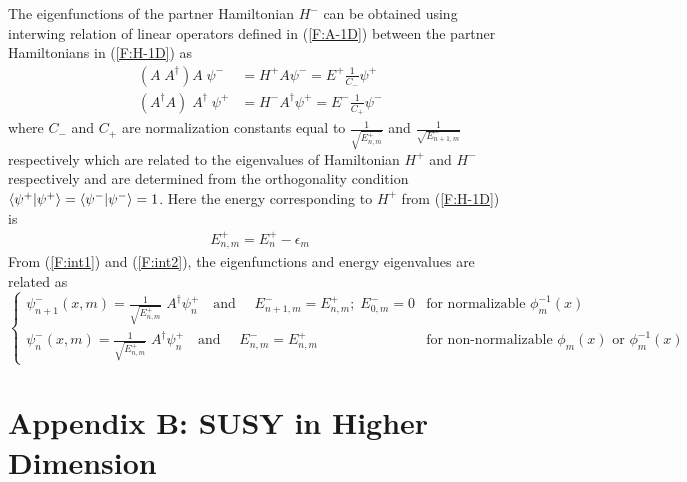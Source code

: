 \documentclass[12pt]{article}
\numberwithin{equation}{section} %
\begin{document}
The eigenfunctions of the partner Hamiltonian $H^-$ can be obtained using interwing relation \cite{fellows2009factorization,marquette2013two} of linear operators defined in (\ref{F:A-1D}) between the partner Hamiltonians in (\ref{F:H-1D}) as
\begin{align}
    \left(A\;A^\dagger\right) A\;\psi^-&=H^+A\psi^-=E^+\frac{1}{C_-}\psi^+\label{F:int1}\\
    \left(A^\dagger A\right)\;A^\dagger\;\psi^+&=H^-A^\dagger\psi^+=E^-\frac{1}{C_+}\psi^-\label{F:int2} 
\end{align}
where \( C_- \) and \( C_+ \) are normalization constants equal to \( \frac{1}{\sqrt{E^+_{n,m}}} \) and \( \frac{1}{\sqrt{E^-_{n+1,m}}} \) respectively which are related to the eigenvalues of Hamiltonian $H^+$ and $H^-$ respectively and are determined from the orthogonality condition \( \braket{\psi^+|\psi^+}=\braket{\psi^-|\psi^-}=1 \). Here the energy corresponding to $H^+$ from (\ref{F:H-1D}) is
\begin{align}\label{E+(n,m)}
    E^+_{n,m}=E^+_n-\epsilon_m
\end{align}
From (\ref{F:int1}) and (\ref{F:int2}), the eigenfunctions and energy eigenvalues are related as
\begin{equation}\label{F:psi-1D}
\begin{cases}
    \psi^-_{n+1}(x,m)=\frac{1}{\sqrt{E^+_{n,m}}}\;A^\dagger\psi^+_{n}\quad \text{and }\quad E^-_{n+1,m}=E^+_{n,m};\;E^-_{0,m}=0& \text{for normalizable }\phi_m^{-1}(x)\\
    \psi^-_{n}(x,m)=\frac{1}{\sqrt{E^+_{n,m}}}\;A^\dagger\psi^+_{n}\quad \text{and }\quad E^-_{n,m}=E^+_{n,m}& \text{for non-normalizable }\phi_m(x) \text{ or }\phi_m^{-1}(x)
\end{cases}
\end{equation}


\renewcommand{\theequation}{B.\arabic{equation}} %
\setcounter{equation}{0} %

\section*{Appendix B: SUSY in Higher Dimension}
\end{document}

